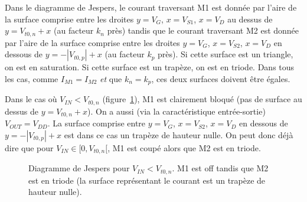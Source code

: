 \documentclass[frenchb,DIV=14]{scrartcl}
\begin{document}
Dans le diagramme de Jespers, le courant traversant M1 est donnée par l'aire de la
surface comprise entre les droites $y = V_G$, $x = V_{S1}$, $x = V_D$ au dessus de 
$y=V_{t0,n}+x$ (au facteur $k_n$ près) tandis que le courant traversant M2 est donnée par
l'aire de la surface comprise entre les droites $y = V_G$, $x = V_{S2}$, $x = V_D$ en
dessous de $y=-|V_{t0,p}|+x$ (au facteur $k_p$ près). Si cette surface est un triangle, on est
en saturation. Si cette surface est un trapèze, on est en triode. Dans tous les cas,
comme $I_{M1} = I_{M2}$ \emph{et} que $k_n = k_p$, ces deux surfaces doivent être égales.

Dans le cas où $V_{IN} < V_{t0,n}$ (figure~\ref{fig:jsp1}), M1 est clairement bloqué (pas de
surface au dessus de $y=V_{t0,n}+x$). On a aussi (via la caractéristique entrée-sortie)
$V_{OUT} = V_{DD}$. La surface comprise entre $y = V_G$, $x = V_{S2}$, $x = V_D$
en dessous de $y=-|V_{t0,p}|+x$  est dans ce cas un trapèze de hauteur nulle.
On peut donc déjà dire que pour $V_{IN} \in [0, V_{t0,n}[$, M1 est coupé alors que
M2 est en triode.

\begin{figure}[ht]
	\centering
	\caption{Diagramme de Jespers pour $V_{IN} < V_{t0,n}$. M1 est off tandis que M2
	est en triode (la surface représentant le courant est un trapèze de hauteur nulle).}
	\label{fig:jsp1}
\end{figure}
\end{document}

